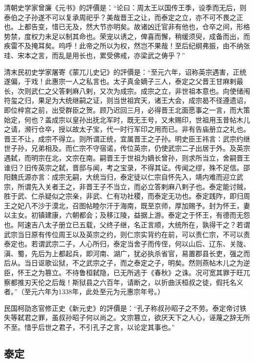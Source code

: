 清朝史学家曾廉《元书》的評價是：“论曰：周太王以国传王季，设季而无后，则泰伯之子孙遂不可以复承周祀乎？美哉晋王之让，而泰定之立，亦不可不畏之正也。上都告变，惜已无及，然大节亦明矣。故诸凶迁官非有他也，仓卒之间，形格势禁，度权力未足以制其命也。荣宠以诱之，俾喜而懈，稍缓须臾，成备而出，而疾雷不及掩耳矣。呜呼！此帝之所以为权，然岂不果哉！至后纪纲弗振，由不纳张珪、宋本之言，而乱是用长也，累受佛戒，亦梁武之俦乎？”

清末民初史学家屠寄《蒙兀儿史记》的評價是：“至元六年，诏称英宗遇害，正统遂偏，于戏！此惠宗一人之私言也。太子真金嫡子三人，泰定之父晋王甘麻剌最长，次则武仁之父答剌麻八剌，又次为成宗。成宗之立，非世祖本意也。向使储闱符玺之归，果足为大统继嗣之证，则当世祖宾天，诸王大会，成宗曷不径遵遗诏，即位梓宫之前，出受群臣之贺。顾乃迟回三月，必得晋王北面愿事之一言，而大策始定，何也？盖成宗以皇孙出抚北军时，既无王号，又未赐印，世祖用玉昔帖木儿之请，濒行仓卒，授以故太子宝，代一时行军印之用而已。非有告庙册立之礼也。晋王不让，成宗不得立。则所谓正统，宜属晋王之子孙。明史臣王祎言：武宗约继世子孙，兄弟相及。而仁宗不守宿诺，传位英宗，仍使武宗二子出居于外。及英宗遇弑，而明宗在北，文宗在南。嗣晋王于世祖为嫡长曾孙，则求所当立，舍嗣晋王谁归？旧传英宗之弑，晋邸与闻，考之宝录，不得其证。传闻之缪，殊不足信。邵阳魏氏源亦言：成宗无嗣，大统当归，泰定徒以仁宗自怀先入，靖内难而迎立武宗，所谓先入关者王之，非晋王子不当立，而必立答剌麻八剌子也。泰定能讨贼，胜于武、仁杀疑似之宗亲，非武、仁有功社稷，而泰定无功也。泰定践阼，即归周王之妃八不沙于漠北，召图帖睦尔汗于海南，既至京师，厚加赐予。封为怀王，妻以主女。初镇建康，六朝都会；及移江陵，益据上游。泰定之于怀王，有德而无怨也。阿速吉八太子册立已五载，父终子继，名正言顺，大统所在，孰得干之？若谓武宗当日原有传位周王以及英宗之约，则仁宗实背约在前，可以责仁宗，不可以责泰定也。若谓武宗二子，人心所归，泰定当舍子而传侄，何以山后、辽东、关陇、滇、蜀，先后为上都起兵，即河南、湖广，犹必执杀省官，易置郡县长吏，强之而后从。当日讴歌讼狱，不之武宗之子，而之泰定之子，明矣。然则燕帖木儿之为逆臣，怀王之为篡立。不待鲁桓弑隐，已无所逃于《春秋》之诛。况可宽其罪于旺兀察都推刃天伦之后哉！斯狱县之六百年，请断之，以折曲沃桓叔之徒，假托名义者。”（至元六年为1338年，此处至元为元惠宗年号。）

民国柯劭忞官修正史《新元史》的評價是：“孔子称叔孙昭子之不劳。泰定帝讨铁失等弑君之罪，虽叔孙昭子何以尚之。文宗篡立，欲厌天下之人心，诬蔑之辞无所不至。惜乎后世之君子，不引孔子之言，以论定其事也。”

\subsection{泰定}

